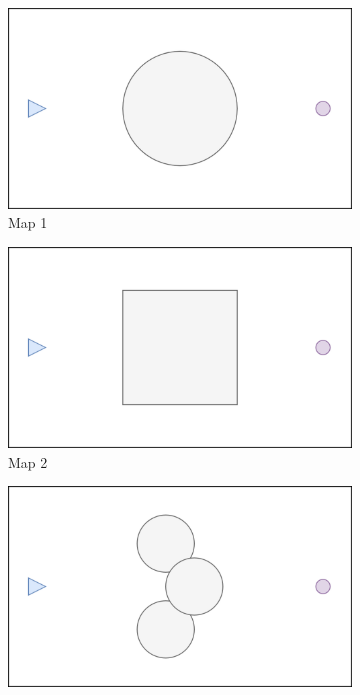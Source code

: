 \documentclass[../main.tex]{subfiles}
\begin{document}
\begin{figure}[H]
	\centering
	\begin{subfigure}[b]{0.24\textwidth}
		\centering
		\includegraphics[width=\textwidth]{IMAGES/part3/map1.png}
		\caption*{Map 1}
		\label{fig:map1}
	\end{subfigure}
	\hfill
	\begin{subfigure}[b]{0.24\textwidth}
		\centering
		\includegraphics[width=\textwidth]{IMAGES/part3/map2.png}
		\caption*{Map 2}
		\label{fig:map2}
	\end{subfigure}
	\hfill
	\begin{subfigure}[b]{0.24\textwidth}
		\centering
		\includegraphics[width=\textwidth]{IMAGES/part3/map3.png}

\end{subfigure}
\end{figure}
\end{document}
